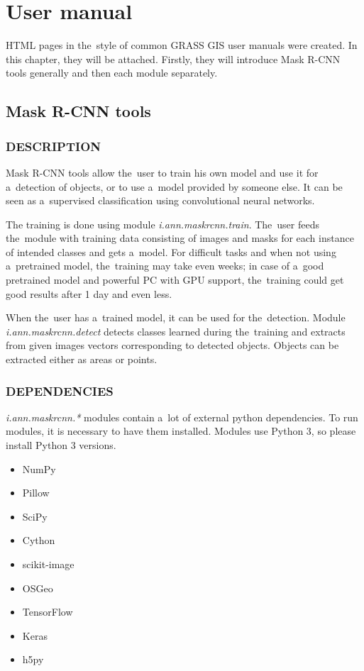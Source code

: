 \chapter{User manual}
\label{manual}

HTML pages in the~style of common GRASS GIS user manuals were created. In this
chapter, they will be attached. Firstly, they will introduce Mask R-CNN tools
generally and then each module separately.

\section{Mask R-CNN tools}
\label{appendix-lib}

\subsection*{DESCRIPTION}

Mask R-CNN tools allow the~user to train his own model and use it for
a~detection of objects, or to use a~model provided by someone else. It can be
seen as a~supervised classification using convolutional neural networks.

The training is done using module \emph{i.ann.maskrcnn.train}. The~user feeds
the~module with training data consisting of images and masks for each instance
of intended classes and gets a~model. For difficult tasks and when not using
a~pretrained model, the~training may take even weeks; in case of a~good
pretrained model and powerful PC with GPU support, the~training could get good
results after 1 day and even less.

When the~user has a~trained model, it can be used for the~detection. Module
\emph{i.ann.maskrcnn.detect} detects classes learned during the~training and 
extracts from given images vectors corresponding to detected objects. Objects 
can be extracted either as areas or points. 

\subsection*{DEPENDENCIES}

\emph{i.ann.maskrcnn.*} modules contain a~lot of external python dependencies.
To run modules, it is necessary to have them installed. Modules use Python 3,
so please install Python 3 versions.

\liststyleLi
\begin{itemize}
\item NumPy
\item Pillow
\item SciPy
\item Cython
\item scikit-image
\item OSGeo
\item TensorFlow
\item Keras
\item h5py
\end{itemize}

